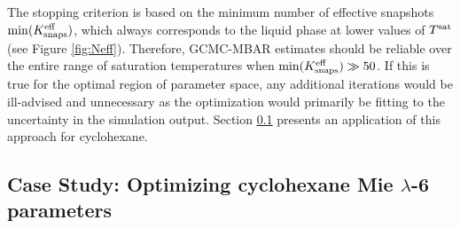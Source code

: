\documentclass[journal=jced,manuscript=article]{achemso}
\begin{document}
The stopping criterion is based on the minimum number of effective snapshots $\min(K_{\rm snaps}^{\rm eff})$, which always corresponds to the liquid phase at lower values of $T^{\rm sat}$ (see Figure \ref{fig:Neff}). Therefore, GCMC-MBAR estimates should be reliable over the entire range of saturation temperatures when $\min(K_{\rm snaps}^{\rm eff}) \gg 50$. If this is true for the optimal region of parameter space, any additional iterations would be ill-advised and unnecessary as the optimization would primarily be fitting to the uncertainty in the simulation output. Section \ref{sec: Case study} presents an application of this approach for cyclohexane.


%


\subsection{Case Study: Optimizing cyclohexane Mie $\lambda$-6 parameters} \label{sec: Case study}

\end{document}

